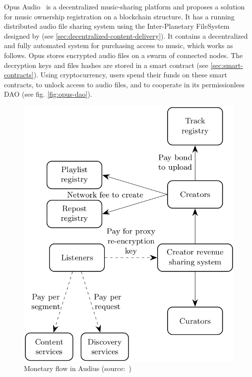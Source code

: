 Opus Audio~\citep{jia2016opus} is a decentralized music-sharing platform and proposes a solution for music ownership registration on a blockchain structure. It has a running distributed audio file sharing system using the Inter-Planetary FileSystem designed by \cite{benet2014ipfs} (see \ref{sec:decentralized-content-delivery}). It contains a decentralized and fully automated system for purchasing access to music, which works as follows. Opus stores encrypted audio files on a swarm of connected nodes. The decryption keys and files hashes are stored in a smart contract (see \ref{sec:smart-contracts}). Using cryptocurrency, users spend their funds on these smart contracts, to unlock access to audio files, and to cooperate in its permissionless DAO (see fig. \ref{fig:opus-dao}).

\begin{figure}
        \includegraphics[width=1\linewidth]{related-work/audius-money-flow.png}
        \caption{Monetary flow in Audius (source:~\cite{audius2018})}
        \label{fig:monetary-flow-audius}
    \endminipage\hfill

\end{figure}
